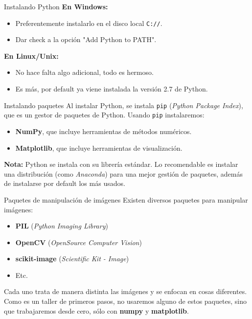 \documentclass[usenames,dvipsnames]{beamer}
\begin{document}
  \begin{frame}{Instalando Python}
    \textbf{En Windows:}
    \begin{itemize}
      \item Preferentemente instalarlo en el disco local \texttt{C://}.
      \item Dar check a la opción "Add Python to PATH".
    \end{itemize}
    \textbf{En Linux/Unix:}
    \begin{itemize}
      \item No hace falta algo adicional, todo es hermoso.
      \item Es más, por default ya viene instalada la versión 2.7 de Python.
    \end{itemize}
  \end{frame}

  \begin{frame}{Instalando paquetes}
    Al instalar Python, se instala \texttt{pip} (\textit{Python Package Index}),
    que es un gestor de paquetes de Python. Usando \texttt{pip} instalaremos:
    \begin{itemize}
      \item \textbf{NumPy}, que incluye herramientas de métodos numéricos.
      \item \textbf{Matplotlib}, que incluye herramientas de visualización.
    \end{itemize}
    \textbf{Nota:} Python se instala con su librería estándar. Lo recomendable
    es instalar una distribución (como \textit{Anaconda}) para una mejor
    gestión de paquetes, además de instalarse por default los más usados.
  \end{frame}

  \begin{frame}{Paquetes de manipulación de imágenes}
    Existen diversos paquetes para manipular imágenes:
    \begin{itemize}
      \item \textbf{PIL} (\textit{Python Imaging Library})
      \item \textbf{OpenCV} (\textit{OpenSource Computer Vision})
      \item \textbf{scikit-image} (\textit{Scientific Kit - Image})
      \item Etc.
    \end{itemize}
    Cada uno trata de manera distinta las imágenes y se enfocan en cosas
    diferentes. Como es un taller de primeros pasos, no usaremos alguno de
    estos paquetes, sino que trabajaremos desde cero, sólo con \textbf{numpy}
    y \textbf{matplotlib}.
  \end{frame}
\end{document}
